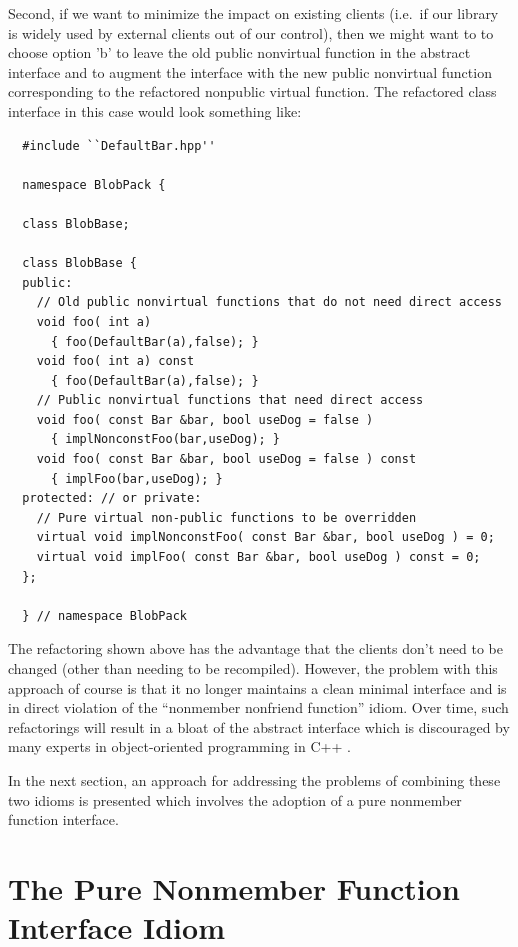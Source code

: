 \documentclass[pdf,ps2pdf,11pt]{SANDreport}
\begin{document}
Second, if we want to minimize the impact on existing clients (i.e.\ if our
library is widely used by external clients out of our control), then we might
want to to choose option 'b' to leave the old public nonvirtual function in
the abstract interface and to augment the interface with the new public
nonvirtual function corresponding to the refactored nonpublic virtual
function.  The refactored class interface in this case would look something
like:

{\small\begin{verbatim}
  #include ``DefaultBar.hpp''

  namespace BlobPack {

  class BlobBase;

  class BlobBase {
  public:
    // Old public nonvirtual functions that do not need direct access
    void foo( int a)
      { foo(DefaultBar(a),false); }
    void foo( int a) const
      { foo(DefaultBar(a),false); }
    // Public nonvirtual functions that need direct access
    void foo( const Bar &bar, bool useDog = false )
      { implNonconstFoo(bar,useDog); }
    void foo( const Bar &bar, bool useDog = false ) const
      { implFoo(bar,useDog); }
  protected: // or private:
    // Pure virtual non-public functions to be overridden
    virtual void implNonconstFoo( const Bar &bar, bool useDog ) = 0;
    virtual void implFoo( const Bar &bar, bool useDog ) const = 0;
  };

  } // namespace BlobPack
\end{verbatim}}

The refactoring shown above has the advantage that the clients don't need to
be changed (other than needing to be recompiled).  However, the problem with
this approach of course is that it no longer maintains a clean minimal
interface and is in direct violation of the ``nonmember nonfriend function''
idiom.  Over time, such refactorings will result in a bloat of the abstract
interface which is discouraged by many experts in object-oriented programming
in C++ {}\cite[Item 33]{C++CodingStandards05}.

In the next section, an approach for addressing the problems of combining
these two idioms is presented which involves the adoption of a pure nonmember
function interface.

%
\section{The Pure Nonmember Function Interface Idiom}
%
\end{document}
